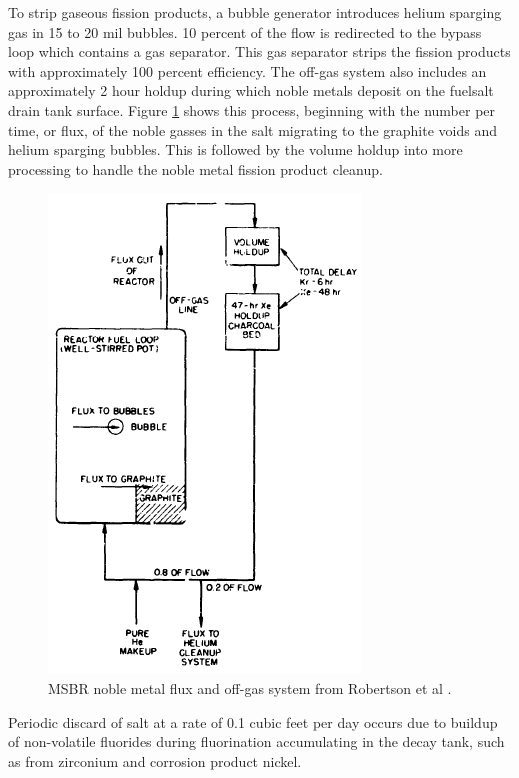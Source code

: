 To strip gaseous fission products, a bubble generator introduces helium sparging gas in 15 to 20 mil bubbles. 10 percent of the flow is redirected to the bypass loop which contains a gas separator. This gas separator strips the fission products with approximately 100 percent efficiency. The off-gas system also includes an approximately 2 hour holdup during which noble metals deposit on the fuelsalt drain tank surface. Figure \ref{fig:msbr_nm_pa} shows this process, beginning with the number per time, or flux, of the noble gasses in the salt migrating to the graphite voids and helium sparging bubbles. This is followed by the volume holdup into more processing to handle the noble metal fission product cleanup.

\begin{figure}[H]
  \centering
  \includegraphics[scale=0.65]{images/msbr_nm_robertson.PNG}
  \caption{MSBR noble metal flux and off-gas system from Robertson et al \cite{robertson_conceptual_1971}.}
   \label{fig:msbr_nm_pa}
\end{figure}

Periodic discard of salt at a rate of 0.1 cubic feet per day occurs due to buildup of non-volatile fluorides during fluorination accumulating in the decay tank, such as from zirconium and corrosion product nickel.



